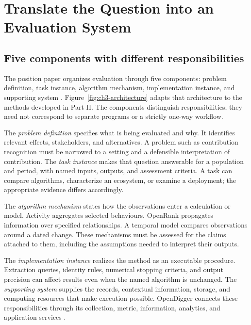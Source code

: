 \section{Translate the Question into an Evaluation System}
\label{sec:ch3-system}
\label{sec:ch3-boundary}

\subsection{Five components with different responsibilities}
The position paper organizes evaluation through five components: problem definition, task instance, algorithm mechanism, implementation instance, and supporting system \citep[Figure 2 and Section 3.1]{han2024ose}. Figure~\ref{fig:ch3-architecture} adapts that architecture to the methods developed in Part II. The components distinguish responsibilities; they need not correspond to separate programs or a strictly one-way workflow.



The \emph{problem definition} specifies what is being evaluated and why. It identifies relevant effects, stakeholders, and alternatives. A problem such as contribution recognition must be narrowed to a setting and a defensible interpretation of contribution. The \emph{task instance} makes that question answerable for a population and period, with named inputs, outputs, and assessment criteria. A task can compare algorithms, characterize an ecosystem, or examine a deployment; the appropriate evidence differs accordingly.

The \emph{algorithm mechanism} states how the observations enter a calculation or model. Activity aggregates selected behaviours. OpenRank propagates information over specified relationships. A temporal model compares observations around a dated change. These mechanisms must be assessed for the claims attached to them, including the assumptions needed to interpret their outputs.

The \emph{implementation instance} realizes the method as an executable procedure. Extraction queries, identity rules, numerical stopping criteria, and output precision can affect results even when the named algorithm is unchanged. The \emph{supporting system} supplies the records, contextual information, storage, and computing resources that make execution possible. OpenDigger connects these responsibilities through its collection, metric, information, analytics, and application services \citep{wang2026digger}.

